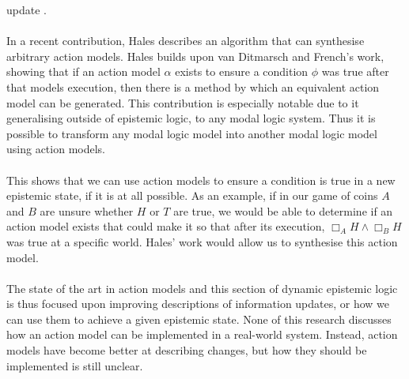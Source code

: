 \documentclass[12pt, a4paper, titlepage]{scrartcl}
\begin{document}
update \cite{van2009simulation,van2010future}.\\
\\
In a recent contribution, Hales describes an algorithm that can synthesise arbitrary
action models.
Hales builds upon van Ditmarsch and French's work, showing that if an action
model $\alpha$ exists to ensure a condition $\phi$ was true after that models
execution, then there is a method by which an equivalent action model can be generated.
This contribution is especially notable due to it generalising outside of
epistemic logic, to any modal logic system.
Thus it is possible to transform any modal logic model into another modal logic
model using action models\cite{hales13synthesis}.\\
\\
This shows that we can use action models to ensure a condition is true
in a new epistemic state, if it is at all possible.
As an example, if in our game of coins $A$ and $B$ are unsure whether $H$ or $T$
are true, we would be able to determine if an action model exists that could
make it so that after its execution, $\Box_A H \land \Box_B H$ was true at a
specific world.
Hales' work would allow us to synthesise this action model.\\
\\
The state of the art in action models and this section of dynamic epistemic
logic is thus focused upon improving descriptions of information updates, or how
we can use them to achieve a given epistemic state.
None of this research discusses how an action model can be implemented in a
real-world system.
Instead, action models have become better at describing changes, but how they
should be implemented is still unclear.
\end{document}

